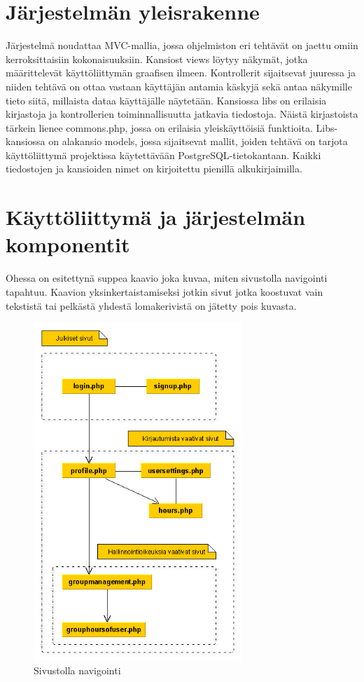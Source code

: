 \documentclass[a4paper, 12pt finnish]{article}
\begin{document}
\section{Järjestelmän yleisrakenne} Järjestelmä noudattaa MVC-mallia,
jossa ohjelmiston eri tehtävät on jaettu omiin kerroksittaisiin
kokonaisuuksiin. Kansiost views löytyy näkymät, jotka määrittelevät
käyttöliittymän graafisen ilmeen. Kontrollerit sijaitsevat juuressa ja
niiden tehtävä on ottaa vastaan käyttäjän antamia käskyjä sekä antaa
näkymille tieto siitä, millaista dataa käyttäjälle näytetään. Kansiossa
libs on erilaisia kirjastoja ja kontrollerien toiminnallisuutta jatkavia
tiedostoja. Näistä kirjastoista tärkein lienee commons.php, jossa on
erilaisia yleiskäyttöisiä funktioita. Libs-kansiossa on alakansio models,
jossa sijaitsevat mallit, joiden tehtävä on tarjota käyttöliittymä 
projektissa käytettävään PostgreSQL-tietokantaan. Kaikki tiedostojen ja
kansioiden nimet on kirjoitettu pienillä alkukirjaimilla.

\section{Käyttöliittymä ja järjestelmän komponentit} Ohessa on esitettynä
suppea kaavio joka kuvaa, miten sivustolla navigointi tapahtuu.
Kaavion yksinkertaistamiseksi jotkin sivut jotka koostuvat vain tekstistä
tai pelkästä yhdestä lomakerivistä on jätetty pois kuvasta.
\begin{figure}[htbp]
    \centering
    \includegraphics[width=0.7\textwidth]{kayttoliittymakaavio.png}
    \caption{\small Sivustolla navigointi}
\end{figure}
\end{document}
